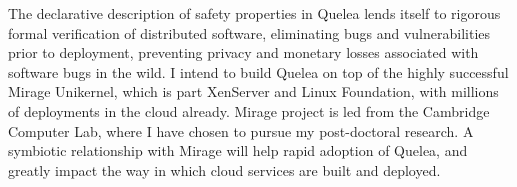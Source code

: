\documentclass{article}
\begin{document}
The declarative description of safety properties in Quelea lends itself to
rigorous formal verification of distributed software, eliminating bugs and
vulnerabilities prior to deployment, preventing privacy and monetary losses
associated with software bugs in the wild. I intend to build Quelea on top of
the highly successful Mirage Unikernel, which is part XenServer and Linux
Foundation, with millions of deployments in the cloud already. Mirage project
is led from the Cambridge Computer Lab, where I have chosen to pursue my
post-doctoral research. A symbiotic relationship with Mirage will help rapid
adoption of Quelea, and greatly impact the way in which cloud services are
built and deployed.


\small

\end{document}
